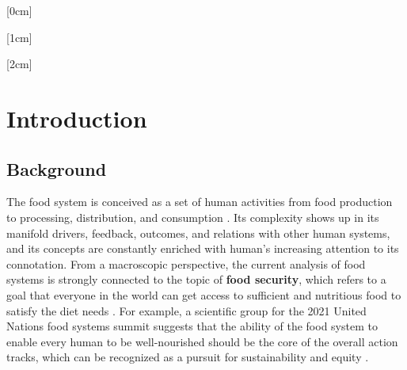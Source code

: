 \documentclass[12pt]{article}
\begin{document}
\newpage
\setcounter{page}{1}

[0cm]{\fontsize{12pt}{\baselineskip}\selectfont}{\hspace*{3em}\contentslabel{2em}\ }%
{}{\titlerule*[0.5pc]{$\cdot$}\contentspage\hspace*{1cm}\vspace*{-0.3em}}%

[1cm]{\fontsize{10pt}{\baselineskip}\selectfont}{\hspace*{3em}\contentslabel{2em}\ }%
{}{\titlerule*[0.5pc]{$\cdot$}\contentspage\hspace*{1cm}\vspace*{-0.5em}}%

[2cm]{\fontsize{10pt}{\baselineskip}\selectfont}{\hspace*{3em}\contentslabel{2em}\ }%
{}{\titlerule*[0.5pc]{$\cdot$}\contentspage\hspace*{1cm}\vspace*{-0.6em}}%

\tableofcontents


\newpage
\section{Introduction}
\vspace{-1em}
\subsection{Background}


The food system is conceived as a set of human activities from food production to processing, distribution, and consumption \cite{cite:Prior}. Its complexity shows up in its manifold drivers, feedback, outcomes, and relations with other human systems, and its concepts are constantly enriched with human's increasing attention to its connotation. From a macroscopic perspective, the current analysis of food systems is strongly connected to the topic of \textbf{food security}, which refers to a goal that everyone in the world can get access to sufficient and nutritious food to satisfy the diet needs \cite{cite:Concept}. For example, a scientific group for the 2021 United Nations food systems summit suggests that the ability of the food system to enable every human to be well-nourished should be the core of the overall action tracks, which can be recognized as a pursuit for sustainability and equity \cite{cite:Summit}.
\end{document}

